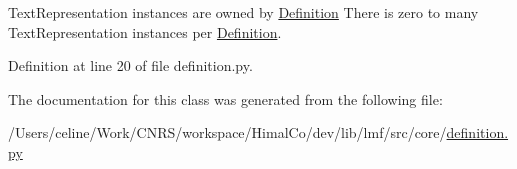 Text\+Representation instances are owned by \hyperlink{classlmf_1_1src_1_1core_1_1definition_1_1_definition}{Definition} There is zero to many Text\+Representation instances per \hyperlink{classlmf_1_1src_1_1core_1_1definition_1_1_definition}{Definition}. 



Definition at line 20 of file definition.\+py.



The documentation for this class was generated from the following file\+:\begin{DoxyCompactItemize}
\item 
/\+Users/celine/\+Work/\+C\+N\+R\+S/workspace/\+Himal\+Co/dev/lib/lmf/src/core/\hyperlink{definition_8py}{definition.\+py}\end{DoxyCompactItemize}
